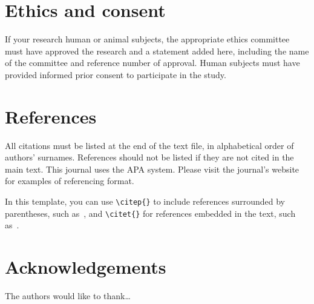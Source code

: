 \documentclass{article}
\begin{document}
\section{Ethics and consent}

If your research human or animal subjects, the appropriate ethics
committee must have approved the research and a statement added here,
including the name of the committee and reference number of approval.
Human subjects must have provided informed prior consent
to participate in the study.

\section{References}

All citations must be listed at the end of the text file,
in alphabetical order of authors' surnames.
References should not be listed if they are not cited in
the main text.
This journal uses the APA system.
Please visit the journal's website
for examples of referencing format.

In this template, you can use \verb=\citep{}= to include references
surrounded by parentheses, such as~\citep{Author:00}, and \verb=\citet{}=
for references embedded in the text, such as~\cite{Author:00}.


\theendnotes

\section*{Acknowledgements}

The authors would like to thank\dots



%
%
%
%
\end{document}

